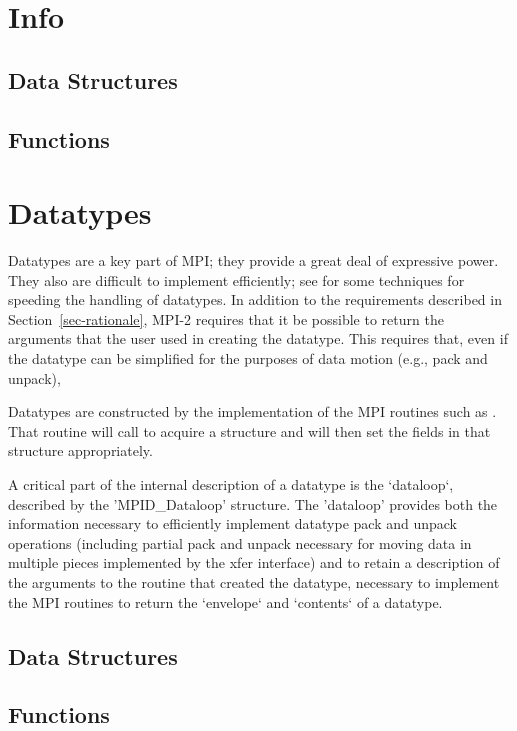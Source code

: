 \documentclass{article}
\begin{document}
\section{Info}

\subsection{Data Structures}

\subsection{Functions}


\section{Datatypes}
Datatypes are a key part of MPI; they provide a great deal of expressive
power.  They also are difficult to implement efficiently; see 
\cite{gropp-swider-lusk99,Traeff:1999:FFE} for some techniques for speeding
the handling of datatypes.
In addition to the requirements described in Section~\ref{sec-rationale}, 
MPI-2 requires that it be possible to return the arguments that the user
used in creating the datatype.  This requires that, even if the datatype can
be simplified for the purposes of data motion (e.g., pack and unpack), 

Datatypes are constructed by the implementation of the MPI routines such as 
.  That routine will call
 to acquire a structure and will then set the fields
in that structure appropriately. 

A critical part of the internal description of a datatype is the
`dataloop`, described by the 'MPID_Dataloop' structure.  
The 'dataloop' provides both the information necessary to
efficiently implement datatype pack and unpack operations (including
partial pack and unpack necessary for moving data in multiple pieces
implemented by the xfer interface)
and to retain a description of the arguments to the routine that
created the datatype, necessary to implement the MPI routines to
return the `envelope` and `contents` of a datatype.

\subsection{Data Structures}

\subsection{Functions}

\end{document}
